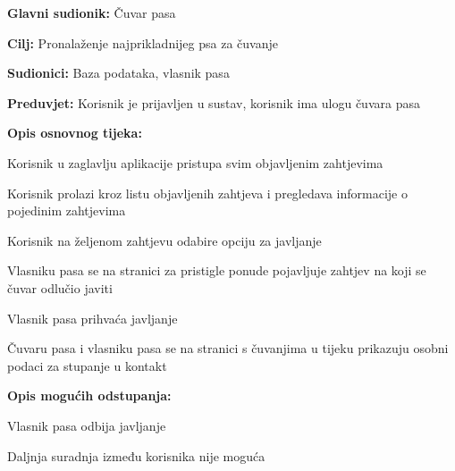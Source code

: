 					\noindent {}
					\begin{packed_item}
						
						\item \textbf{Glavni sudionik: } Čuvar pasa
						\item  \textbf{Cilj:} Pronalaženje najprikladnijeg psa za čuvanje
						\item  \textbf{Sudionici:} Baza podataka, vlasnik pasa
						\item  \textbf{Preduvjet:} Korisnik je prijavljen u sustav, korisnik ima ulogu čuvara pasa
						\item  \textbf{Opis osnovnog tijeka:}
						
						\item[] \begin{packed_enum}
							
							\item Korisnik u zaglavlju aplikacije pristupa svim objavljenim zahtjevima  
							\item Korisnik prolazi kroz listu objavljenih zahtjeva i pregledava informacije o pojedinim zahtjevima
							\item Korisnik na željenom zahtjevu odabire opciju za javljanje 
							\item Vlasniku pasa se na stranici za pristigle ponude pojavljuje zahtjev na koji se čuvar odlučio javiti
							\item Vlasnik pasa prihvaća javljanje
							\item Čuvaru pasa i vlasniku pasa se na stranici s čuvanjima u tijeku prikazuju osobni podaci za stupanje u kontakt
							
						\end{packed_enum}
						
						\item  \textbf{Opis mogućih odstupanja:}
						
						\item[] \begin{packed_item}
							
							\item[5.a] Vlasnik pasa odbija javljanje 
							\item[] \begin{packed_enum}
								
								\item Daljnja suradnja između korisnika nije moguća
								
							\end{packed_enum}
						\end{packed_item}
					\end{packed_item}	
				
